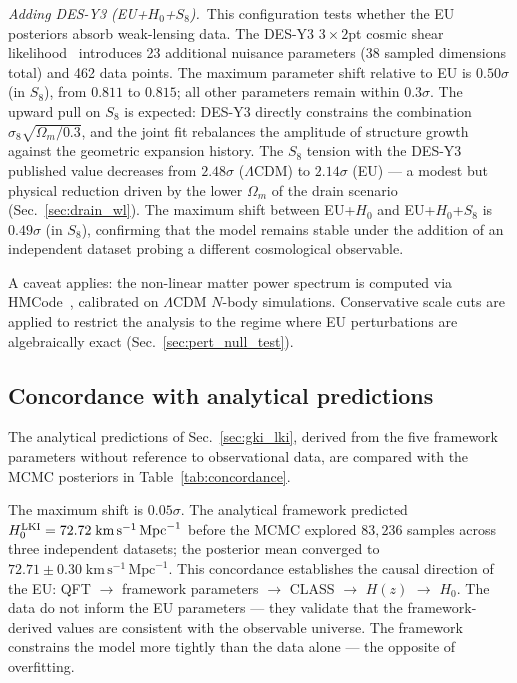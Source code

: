 \documentclass[a4paper,fleqn]{cas-dc}
\begin{document}
\textit{Adding DES-Y3 (EU+$H_0$+$S_8$).}~This
configuration tests whether the EU posteriors
absorb weak-lensing data. The DES-Y3 $3 \times 2$pt cosmic
shear likelihood~\cite{des2022} introduces 23 additional
nuisance parameters (38 sampled dimensions total) and 462
data points. The maximum parameter shift relative to EU is
$0.50\sigma$ (in $S_8$), from $0.811$ to $0.815$; all other
parameters remain within $0.3\sigma$. The upward pull on
$S_8$ is expected: DES-Y3 directly constrains the
combination $\sigma_8 \sqrt{\Omega_m / 0.3}$, and the
joint fit rebalances the amplitude of structure growth
against the geometric expansion history. The $S_8$ tension
with the DES-Y3 published value decreases from $2.48\sigma$
($\Lambda$CDM) to $2.14\sigma$ (EU) --- a modest but
physical reduction driven by the lower $\Omega_m$ of the
drain scenario (Sec.~\ref{sec:drain_wl}). The maximum shift
between EU+$H_0$ and EU+$H_0$+$S_8$ is $0.49\sigma$ (in
$S_8$), confirming that the model remains stable under the
addition of an independent dataset probing a different
cosmological observable.

A caveat applies: the non-linear
matter power spectrum is computed via
HMCode~\cite{mead2021}, calibrated on $\Lambda$CDM
$N$-body simulations. Conservative scale cuts are applied
to restrict the analysis to the regime where EU
perturbations are algebraically exact
(Sec.~\ref{sec:pert_null_test}).

\subsection{Concordance with analytical predictions}
\label{sec:concordance}

The analytical predictions of Sec.~\ref{sec:gki_lki},
derived from the five framework parameters without
reference to observational data, are compared with the
MCMC posteriors in Table~\ref{tab:concordance}.


The maximum shift is $0.05\sigma$. The analytical framework
predicted $H_0^{\rm LKI} = 72.72\;\text{km}\,\text{s}^{-1}\,\text{Mpc}^{-1}$ before
the MCMC explored $83{,}236$ samples across three
independent datasets; the posterior mean converged to
$72.71 \pm 0.30\;\text{km}\,\text{s}^{-1}\,\text{Mpc}^{-1}$. This concordance
establishes the causal direction of the EU: QFT $\to$
framework parameters $\to$ CLASS $\to$ $H(z)$ $\to$ $H_0$.
The data do not inform the EU parameters --- they validate
that the framework-derived values are consistent with the
observable universe. The framework constrains the model more
tightly than the data alone --- the opposite of overfitting.
\end{document}
